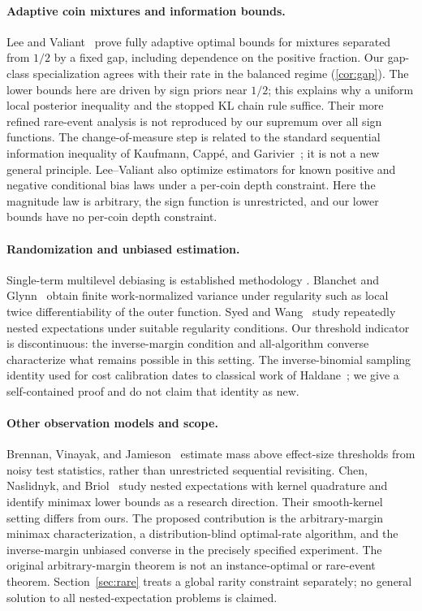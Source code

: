 \paragraph{Adaptive coin mixtures and information bounds.}
Lee and Valiant~\cite{leevaliant} prove fully adaptive optimal bounds for
mixtures separated from $1/2$ by a fixed gap, including dependence on the
positive fraction. Our gap-class specialization agrees with their rate in
the balanced regime (\cref{cor:gap}). The lower bounds here are driven by
sign priors near $1/2$; this explains why a uniform local posterior inequality
and the stopped KL chain rule suffice. Their more refined rare-event
analysis is not reproduced by our supremum over all sign functions.
The change-of-measure step is related to the standard sequential information
inequality of Kaufmann, Capp\'e, and Garivier~\cite{kaufmann}; it is not a
new general principle. Lee--Valiant also optimize estimators for known
positive and negative conditional bias laws under a per-coin depth constraint.
Here the magnitude law is arbitrary, the sign function is unrestricted,
and our lower bounds have no per-coin depth constraint.

\paragraph{Randomization and unbiased estimation.}
Single-term multilevel debiasing is established methodology
\cite{rheeglynn,vihola}. Blanchet and Glynn~\cite{blanchetglynn} obtain
finite work-normalized variance under regularity such as local twice
differentiability of the outer function. Syed and Wang~\cite{syedwang}
study repeatedly nested expectations under suitable regularity conditions.
Our threshold indicator is discontinuous: the inverse-margin condition and
all-algorithm converse characterize what remains possible in this setting.
The inverse-binomial sampling identity used for cost calibration dates to
classical work of Haldane~\cite{haldane}; we give a self-contained proof and
do not claim that identity as new.

\paragraph{Other observation models and scope.}
Brennan, Vinayak, and Jamieson~\cite{brennan} estimate mass above effect-size
thresholds from noisy test statistics, rather than unrestricted sequential
revisiting. Chen, Naslidnyk, and Briol~\cite{chen} study nested expectations
with kernel quadrature and identify minimax lower bounds as a research
direction. Their smooth-kernel setting differs from ours.
The proposed contribution is the arbitrary-margin minimax characterization,
a distribution-blind optimal-rate algorithm, and the inverse-margin unbiased
converse in the precisely specified experiment. The original arbitrary-margin theorem is not an instance-optimal or
rare-event theorem. Section~\ref{sec:rare} treats a global rarity
constraint separately; no general solution to all nested-expectation
problems is claimed.


